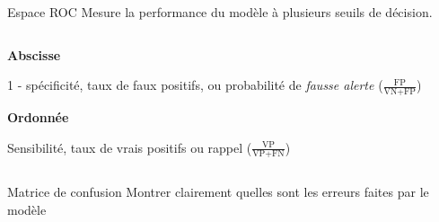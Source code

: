 \begin{frame}{Espace ROC}
  Mesure la performance du modèle à plusieurs seuils de décision.
  \begin{columns}
    \begin{column}{.48\textwidth}
      \textbf{Abscisse}

      1 - spécificité, taux de faux positifs, ou probabilité de \emph{fausse alerte} ($\frac{\text{FP}}{\text{VN} + \text{FP}}$)
 
      \vspace{1cm}
      \textbf{Ordonnée}
  
      Sensibilité, taux de vrais positifs ou rappel ($\frac{\text{VP}}{\text{VP} + \text{FN}}$)
    \end{column}
    \begin{column}{.52\textwidth}
    \end{column}
  \end{columns}
\end{frame}

\begin{frame}{Matrice de confusion}
  Montrer clairement quelles sont les erreurs faites par le modèle
\end{frame}
